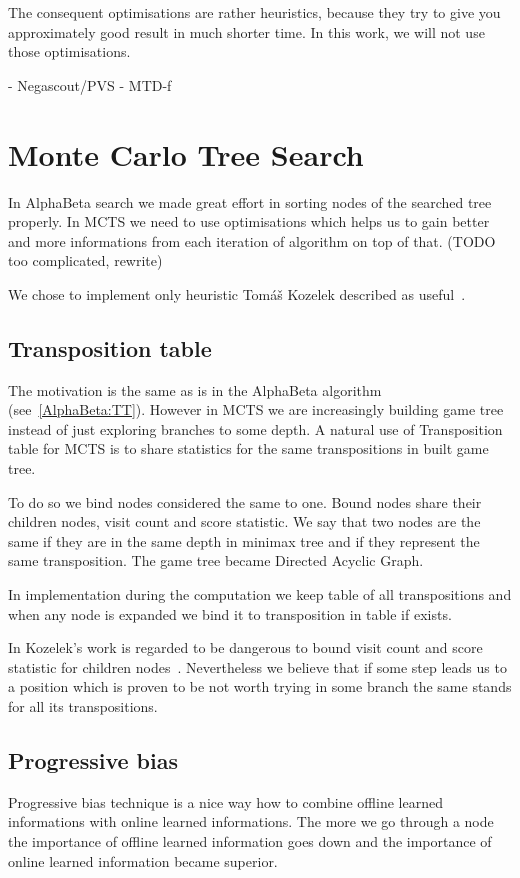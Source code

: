 The consequent optimisations are rather heuristics, because they try to
give you approximately good result in much shorter time. In this work, we
will not use those optimisations.


- Negascout/PVS
- MTD-f


\section{Monte Carlo Tree Search}
In AlphaBeta search we made great effort in sorting nodes of the searched tree
properly. In MCTS we need to use optimisations which helps us to gain better
and more informations from each iteration of algorithm on top of that.
(TODO too complicated, rewrite)

We chose to implement only heuristic Tomáš Kozelek described as
useful~\cite{KOZELEK}.

\subsection{Transposition table}
The motivation is the same as is in the AlphaBeta algorithm
(see~\ref{AlphaBeta:TT}). However in MCTS we are increasingly building game
tree instead of just exploring branches to some depth. A natural use of
Transposition table for MCTS is to share statistics for the same transpositions
in built game tree.

To do so we bind nodes considered the same to one. Bound nodes share their
children nodes, visit count and score statistic. We say that two nodes are the
same if they are in the same depth in minimax tree and if they represent the
same transposition. The game tree became Directed Acyclic Graph.

In implementation during the computation we keep table of all transpositions
and when any node is expanded we bind it to transposition in table if exists.

In Kozelek's work is regarded to be dangerous to bound visit count and score
statistic for children nodes~\cite{KOZELEK}. Nevertheless we believe that if
some step leads us to a position which is proven to be not worth trying in some
branch the same stands for all its transpositions.

\subsection{Progressive bias}
Progressive bias technique is a nice way how to combine offline learned
informations with online learned informations. The more we go through a node
the importance of offline learned information goes down and the importance of
online learned information became superior.

